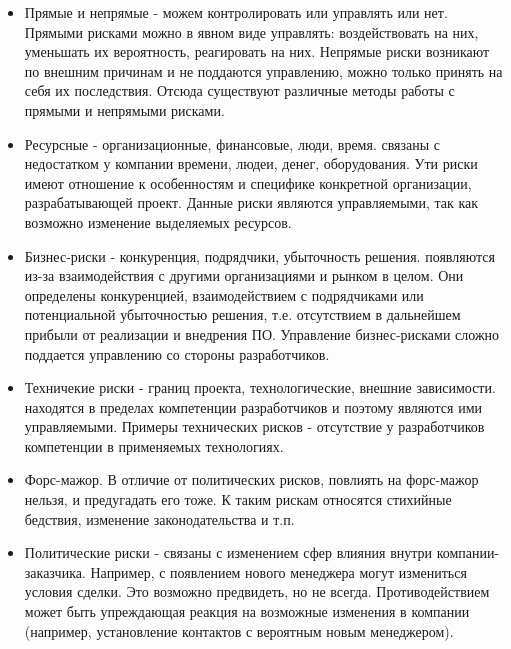 \begin{itemize}
    \item Прямые и непрямые - можем контролировать или управлять или нет. Прямыми рисками можно в явном виде управлять: воздействовать на них, уменьшать их вероятность, реагировать на них. Непрямые риски возникают по внешним причинам и не поддаются управлению, можно только принять на себя их последствия. Отсюда существуют различные методы работы с прямыми и непрямыми рисками.
    \item Ресурсные - организационные, финансовые, люди, время. связаны с недостатком у компании времени, людеи, денег, оборудования. Ути риски имеют отношение к особенностям и специфике конкретной организации, разрабатывающей проект. Данные риски являются управляемыми, так как возможно изменение выделяемых ресурсов.
    \item Бизнес-риски - конкуренция, подрядчики, убыточность решения. появляются из-за взаимодействия с другими организациями и рынком в целом. Они определены конкуренцией, взаимодействием с подрядчиками или потенциальной убыточностью решения, т.е. отсутствием в дальнейшем прибыли от реализации и внедрения ПО. Управление бизнес-рисками сложно поддается управлению со стороны разработчиков.
    \item Техничекие риски - границ проекта, технологические, внешние зависимости. находятся в пределах компетенции разработчиков и поэтому являются ими управляемыми. Примеры технических рисков - отсутствие у разработчиков компетенции в применяемых технологиях.
    \item Форс-мажор. В отличие от политических рисков, повлиять на форс-мажор нельзя, и предугадать его тоже. К таким рискам относятся стихийные бедствия, изменение законодательства и т.п.
    \item Политические риски - связаны с изменением сфер влияния внутри компании-заказчика.
    Например, с появлением нового менеджера могут измениться условия сделки. Это возможно предвидеть, но не всегда. Противодействием может быть упреждающая реакция на возможные изменения в компании (например, установление контактов с вероятным новым менеджером).
\end{itemize}